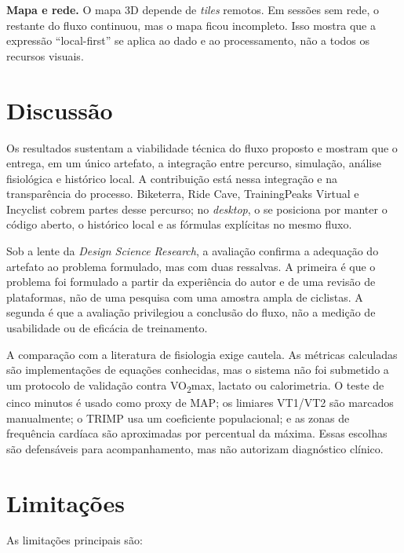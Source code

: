 \textbf{Mapa e rede.} O mapa 3D depende de \textit{tiles} remotos. Em sessões
sem rede, o restante do fluxo continuou, mas o mapa ficou incompleto. Isso
mostra que a expressão ``local-first'' se aplica ao dado e ao processamento, não
a todos os recursos visuais.

\section{Discussão}
\label{sec:discussao-resultados}

Os resultados sustentam a viabilidade técnica do fluxo proposto e mostram que
o \argus{} entrega, em um único artefato, a integração entre percurso,
simulação, análise fisiológica e histórico local. A contribuição está nessa
integração e na transparência do processo. Biketerra, Ride Cave, TrainingPeaks
Virtual e Incyclist cobrem partes desse percurso; no \textit{desktop}, o
\argus{} se posiciona por manter o código aberto, o histórico local e as
fórmulas explícitas no mesmo fluxo.

Sob a lente da \textit{Design Science Research}, a avaliação confirma a
adequação do artefato ao problema formulado, mas com duas ressalvas. A primeira
é que o problema foi formulado a partir da experiência do autor e de uma
revisão de plataformas, não de uma pesquisa com uma amostra ampla de ciclistas.
A segunda é que a avaliação privilegiou a conclusão do fluxo, não a medição de
usabilidade ou de eficácia de treinamento.

A comparação com a literatura de fisiologia exige cautela. As métricas
calculadas são implementações de equações conhecidas, mas o sistema não foi
submetido a um protocolo de validação contra VO\textsubscript{2}max, lactato ou
calorimetria. O teste de cinco minutos é usado como proxy de MAP; os limiares
VT1/VT2 são marcados manualmente; o TRIMP usa um coeficiente populacional; e as zonas de
frequência cardíaca são aproximadas por percentual da máxima. Essas escolhas são
defensáveis para acompanhamento, mas não autorizam diagnóstico clínico.

\section{Limitações}
\label{sec:limitacoes-resultados}

As limitações principais são:

